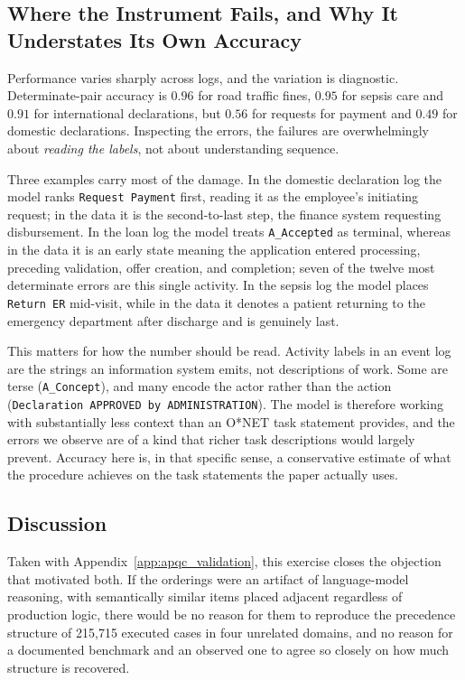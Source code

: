 \subsection{Where the Instrument Fails, and Why It Understates Its Own Accuracy}
\label{app:eventlog_failures}

Performance varies sharply across logs, and the variation is diagnostic.
Determinate-pair accuracy is $0.96$ for road traffic fines, $0.95$ for sepsis care and $0.91$ for
international declarations, but $0.56$ for requests for payment and $0.49$ for domestic declarations.
Inspecting the errors, the failures are overwhelmingly about \emph{reading the labels}, not about
understanding sequence.

Three examples carry most of the damage.
In the domestic declaration log the model ranks \texttt{Request Payment} first, reading it as the employee's
initiating request; in the data it is the second-to-last step, the finance system requesting disbursement.
In the loan log the model treats \texttt{A\_Accepted} as terminal, whereas in the data it is an early state
meaning the application entered processing, preceding validation, offer creation, and completion; seven of
the twelve most determinate errors are this single activity.
In the sepsis log the model places \texttt{Return ER} mid-visit, while in the data it denotes a patient
returning to the emergency department after discharge and is genuinely last.

This matters for how the number should be read.
Activity labels in an event log are the strings an information system emits, not descriptions of work.
Some are terse (\texttt{A\_Concept}), and many encode the actor rather than the action
(\texttt{Declaration APPROVED by ADMINISTRATION}).
The model is therefore working with substantially less context than an O*NET task statement provides, and the
errors we observe are of a kind that richer task descriptions would largely prevent.
Accuracy here is, in that specific sense, a conservative estimate of what the procedure achieves on the task
statements the paper actually uses.

\subsection{Discussion}
\label{app:eventlog_discussion}

Taken with Appendix~\ref{app:apqc_validation}, this exercise closes the objection that motivated both.
If the orderings were an artifact of language-model reasoning, with semantically similar items placed
adjacent regardless of production logic, there would be no reason for them to reproduce the precedence
structure of 215,715 executed cases in four unrelated domains, and no reason for a documented benchmark and
an observed one to agree so closely on how much structure is recovered.

